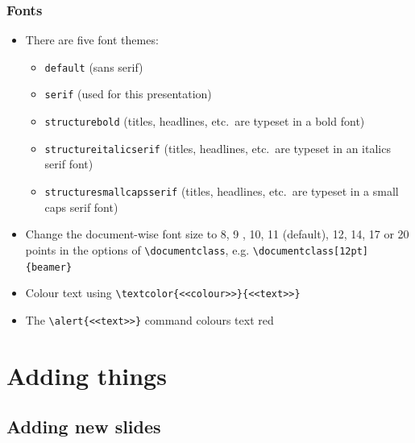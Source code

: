 \documentclass[xcolor=pdftex,t,11pt]{beamer}
\begin{document}
\begin{frame}[fragile]
\frametitle{Fonts}
\begin{itemize}
\item There are five font themes: 
\begin{itemize}
	\item \verb!default! (sans serif)
	\item \verb!serif! (used for this presentation) 
	\item \verb!structurebold! (titles, headlines, etc.\ are typeset in a bold font)
	\item \verb!structureitalicserif! (titles, headlines, etc.\ are typeset in an italics serif font)
	\item \verb!structuresmallcapsserif! (titles, headlines, etc.\ are typeset in a small caps serif font)
\end{itemize}
\item Change the document-wise font size to 8, 9 , 10, 11 (default), 12, 14, 17 or 20 points in the options of \verb!\documentclass!, e.g. \verb!\documentclass[12pt]{beamer}!
\item Colour text using \verb!\textcolor{<<colour>>}{<<text>>}!
\item The \verb!\alert{<<text>>}! command colours text red
\end{itemize}
\end{frame}


\section{Adding things}


\subsection{Adding new slides}
\end{document}
